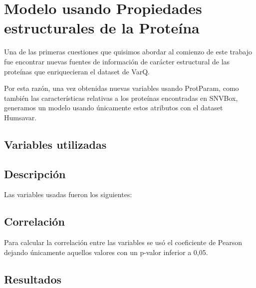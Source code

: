 \section{Modelo usando Propiedades estructurales de la Proteína}

Una de las primeras cuestiones que quisimos abordar al comienzo de este trabajo fue encontrar nuevas fuentes de información de carácter estructural de las proteínas que enriquecieran el dataset de VarQ. 

Por esta razón, una vez obtenidas nuevas variables usando ProtParam, como también las características relativas a los proteínas encontradas en SNVBox, generamos un modelo usando únicamente estos atributos con el dataset Humsavar. 


\subsection{Variables utilizadas}

\subsection{Descripción}

Las variables usadas fueron los siguientes:



\subsection{Correlación}

Para calcular la correlación entre las variables se usó el coeficiente de Pearson dejando únicamente aquellos valores con un p-valor inferior a 0,05.





\subsection{Resultados}


